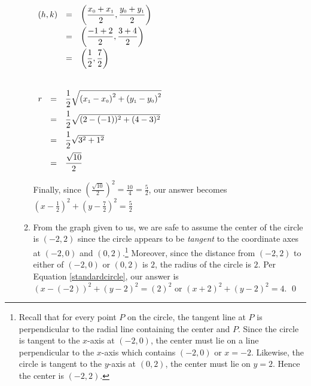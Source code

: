\documentclass{ximera}
\begin{document}
\begin{ex}
\begin{enumerate}
\begin{enumerate}
\begin{multicols}{2}

$\begin{array}{rcl} (h,k) &  = & \left( \dfrac{x_{\text{\tiny$0$}} + x_{\text{\tiny$1$}}}{2},  \dfrac{y_{\text{\tiny$0$}} + y_{\text{\tiny$1$}}}{2} \right) \\ [8pt]
&  = &  \left( \dfrac{-1+2}{2},  \dfrac{3+4}{2} \right) \\ [8pt]
& = &  \left( \dfrac{1}{2},  \dfrac{7}{2} \right)   \\  [8pt]
&& \\ \end{array}$

$\begin{array}{rcl} r &  = & \dfrac{1}{2} \sqrt{\left(x_{\text{\tiny$1$}} - x_{\text{\tiny$0$}}\right)^2+\left(y_{\text{\tiny$1$}}-y_{\text{\tiny$0$}}\right)^2}  \\ [8pt]
 &  = & \dfrac{1}{2} \sqrt{(2-(-1))^2+(4-3)^2} \\ [8pt]
 & = & \dfrac{1}{2} \sqrt{3^2+1^2} \\ [8pt]
 & = &\dfrac{\sqrt{10}}{2} \end{array} $
 
 \end{multicols}
 
 
Finally, since $\left( \frac{\sqrt{10}}{2} \right)^2 = \frac{10}{4} = \frac{5}{2}$, our answer becomes $\left(x - \frac{1}{2} \right)^2 + \left(y - \frac{7}{2} \right)^2 =\frac{5}{2}$

\item  From the graph given to us, we are safe to assume the center of the circle is $(-2,2)$ since the circle appears to be \textit{tangent} to the coordinate axes at $(-2,0)$ and $(0,2)$.\footnote{Recall that for every point $P$ on the circle, the tangent line at $P$ is perpendicular to the radial line containing the center and $P$. Since the circle is tangent to the $x$-axis at $(-2,0)$, the center must lie on a line perpendicular to the $x$-axis which contains $(-2,0)$ or $x = -2$.  Likewise,  the circle is tangent to the $y$-axis at $(0,2)$,  the center must lie on $y=2$.  Hence the center is $(-2,2)$.}   Moreover, since the distance from $(-2,2)$ to either of $(-2,0)$ or $(0,2)$ is $2$, the radius of the circle is $2$.  Per Equation \ref{standardcircle}, our answer is $(x-(-2))^2 + (y-2)^2 = (2)^2$ or $(x+2)^2+(y-2)^2 = 4$. \qed

\end{enumerate}

\end{enumerate}

\end{ex}
\end{document}
